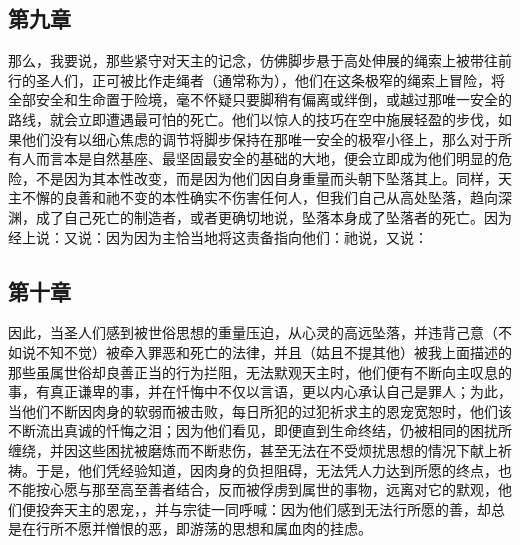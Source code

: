 
\subsection{第九章}

\par

那么，我要说，那些紧守对天主的记念，仿佛脚步悬于高处伸展的绳索上被带往前行的圣人们，正可被比作走绳者（通常称为），他们在这条极窄的绳索上冒险，将全部安全和生命置于险境，毫不怀疑只要脚稍有偏离或绊倒，或越过那唯一安全的路线，就会立即遭遇最可怕的死亡。他们以惊人的技巧在空中施展轻盈的步伐，如果他们没有以细心焦虑的调节将脚步保持在那唯一安全的极窄小径上，那么对于所有人而言本是自然基座、最坚固最安全的基础的大地，便会立即成为他们明显的危险，不是因为其本性改变，而是因为他们因自身重量而头朝下坠落其上。同样，天主不懈的良善和祂不变的本性确实不伤害任何人，但我们自己从高处坠落，趋向深渊，成了自己死亡的制造者，或者更确切地说，坠落本身成了坠落者的死亡。因为经上说：又说：因为因为主恰当地将这责备指向他们：祂说，又说：\par


\subsection{第十章}

\par

因此，当圣人们感到被世俗思想的重量压迫，从心灵的高远坠落，并违背己意（不如说不知不觉）被牵入罪恶和死亡的法律，并且（姑且不提其他）被我上面描述的那些虽属世俗却良善正当的行为拦阻，无法默观天主时，他们便有不断向主叹息的事，有真正谦卑的事，并在忏悔中不仅以言语，更以内心承认自己是罪人；为此，当他们不断因肉身的软弱而被击败，每日所犯的过犯祈求主的恩宠宽恕时，他们该不断流出真诚的忏悔之泪；因为他们看见，即便直到生命终结，仍被相同的困扰所缠绕，并因这些困扰被磨炼而不断悲伤，甚至无法在不受烦扰思想的情况下献上祈祷。于是，他们凭经验知道，因肉身的负担阻碍，无法凭人力达到所愿的终点，也不能按心愿与那至高至善者结合，反而被俘虏到属世的事物，远离对它的默观，他们便投奔天主的恩宠，，并与宗徒一同呼喊：因为他们感到无法行所愿的善，却总是在行所不愿并憎恨的恶，即游荡的思想和属血肉的挂虑。\par

